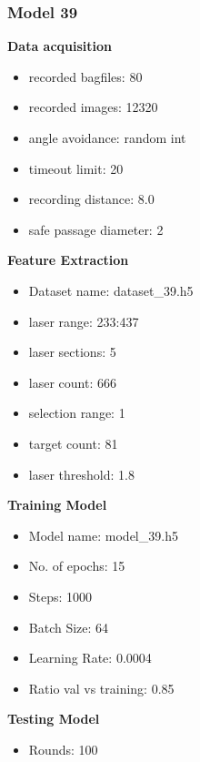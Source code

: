 \subsubsection{Model 39\label{model_39} }
\begin{multicols}{2}\textbf{Data acquisition}
\begin{itemize}
\setlength\itemsep{0.1em}
\item recorded bagfiles: 80
\item recorded images: 12320
\item angle avoidance: random int
\item timeout limit: 20
\item recording distance: 8.0
\item safe passage diameter: 2
\end{itemize}
\textbf{Feature Extraction}
\begin{itemize}
\setlength\itemsep{0.1em}
\item Dataset name: dataset\_39.h5
\item  laser range: 233:437
\item  laser sections: 5
\item  laser count: 666
\item  selection range: 1
\item  target count: 81
\item  laser threshold: 1.8
\end{itemize}
\columnbreak\textbf{Training Model}
\begin{itemize}
\setlength\itemsep{0.1em}
\item  Model name: model\_39.h5
\item  No. of epochs: 15
\item  Steps: 1000
\item  Batch Size: 64
\item  Learning Rate: 0.0004
\item  Ratio val vs training: 0.85
\end{itemize}
\textbf{Testing Model}
\begin{itemize}
\setlength\itemsep{0.1em}
\item Rounds: 100
\newline
\newline
\newline
\newline
\newline
\newline
\newline
\newline

\end{itemize}
\end{multicols}
